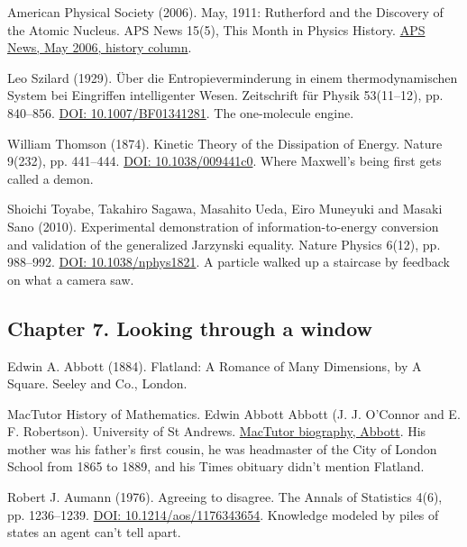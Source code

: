 \documentclass[11pt,twoside]{article}
\theoremstyle{thielethm}
\theoremstyle{thieledef}
\theoremstyle{thieledef}
\theoremstyle{thieledef}
\theoremstyle{thielethm}
\theoremstyle{thieleobs}
\theoremstyle{thielethm}
\begin{document}
\noindent American Physical Society (2006). May, 1911: Rutherford and the Discovery of the Atomic Nucleus. APS News 15(5), This Month in Physics History. \href{https://www.aps.org/publications/apsnews/200605/history.cfm}{APS News, May 2006, history column}.
\par\medskip

\noindent Leo Szilard (1929). \"Uber die Entropieverminderung in einem thermodynamischen System bei Eingriffen intelligenter Wesen. Zeitschrift f\"ur Physik 53(11--12), pp. 840--856. \href{https://doi.org/10.1007/BF01341281}{DOI: 10.1007/BF01341281}. The one-molecule engine.
\par\medskip

\noindent William Thomson (1874). Kinetic Theory of the Dissipation of Energy. Nature 9(232), pp. 441--444. \href{https://doi.org/10.1038/009441c0}{DOI: 10.1038/009441c0}. Where Maxwell's being first gets called a demon.
\par\medskip

\noindent Shoichi Toyabe, Takahiro Sagawa, Masahito Ueda, Eiro Muneyuki and Masaki Sano (2010). Experimental demonstration of information-to-energy conversion and validation of the generalized Jarzynski equality. Nature Physics 6(12), pp. 988--992. \href{https://doi.org/10.1038/nphys1821}{DOI: 10.1038/nphys1821}. A particle walked up a staircase by feedback on what a camera saw.
\par\medskip

\subsection*{Chapter 7. Looking through a window}

\noindent Edwin A. Abbott (1884). Flatland: A Romance of Many Dimensions, by A Square. Seeley and Co., London.
\par\medskip

\noindent MacTutor History of Mathematics. Edwin Abbott Abbott (J. J. O'Connor and E. F. Robertson). University of St Andrews. \href{https://mathshistory.st-andrews.ac.uk/Biographies/Abbott/}{MacTutor biography, Abbott}. His mother was his father's first cousin, he was headmaster of the City of London School from 1865 to 1889, and his Times obituary didn't mention Flatland.
\par\medskip

\noindent Robert J. Aumann (1976). Agreeing to disagree. The Annals of Statistics 4(6), pp. 1236--1239. \href{https://doi.org/10.1214/aos/1176343654}{DOI: 10.1214/aos/1176343654}. Knowledge modeled by piles of states an agent can't tell apart.
\par\medskip
\end{document}

